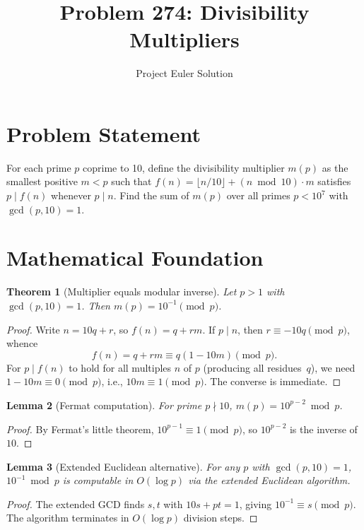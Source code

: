 \documentclass[12pt]{article}
\title{Problem 274: Divisibility Multipliers}
\author{Project Euler Solution}
\date{}
\newtheorem{theorem}{Theorem}
\newtheorem{lemma}[theorem]{Lemma}
\begin{document}
\maketitle

\section{Problem Statement}
For each prime $p$ coprime to 10, define the divisibility multiplier $m(p)$ as the smallest positive $m < p$ such that $f(n) = \lfloor n/10 \rfloor + (n \bmod 10)\cdot m$ satisfies $p \mid f(n)$ whenever $p \mid n$. Find the sum of $m(p)$ over all primes $p < 10^7$ with $\gcd(p,10)=1$.

\section{Mathematical Foundation}

\begin{theorem}[Multiplier equals modular inverse]
Let $p > 1$ with $\gcd(p,10)=1$. Then $m(p) = 10^{-1} \pmod{p}$.
\end{theorem}

\begin{proof}
Write $n = 10q + r$, so $f(n) = q + rm$. If $p \mid n$, then $r \equiv -10q\pmod{p}$, whence
\[
f(n) = q + rm \equiv q(1 - 10m) \pmod{p}.
\]
For $p \mid f(n)$ to hold for all multiples $n$ of $p$ (producing all residues~$q$), we need $1 - 10m \equiv 0 \pmod{p}$, i.e., $10m \equiv 1 \pmod{p}$. The converse is immediate.
\end{proof}

\begin{lemma}[Fermat computation]
For prime $p \nmid 10$, $m(p) = 10^{p-2} \bmod p$.
\end{lemma}

\begin{proof}
By Fermat's little theorem, $10^{p-1} \equiv 1\pmod{p}$, so $10^{p-2}$ is the inverse of~$10$.
\end{proof}

\begin{lemma}[Extended Euclidean alternative]
For any $p$ with $\gcd(p,10)=1$, $10^{-1}\bmod p$ is computable in $O(\log p)$ via the extended Euclidean algorithm.
\end{lemma}

\begin{proof}
The extended GCD finds $s,t$ with $10s + pt = 1$, giving $10^{-1} \equiv s\pmod{p}$. The algorithm terminates in $O(\log p)$ division steps.
\end{proof}
\end{document}
